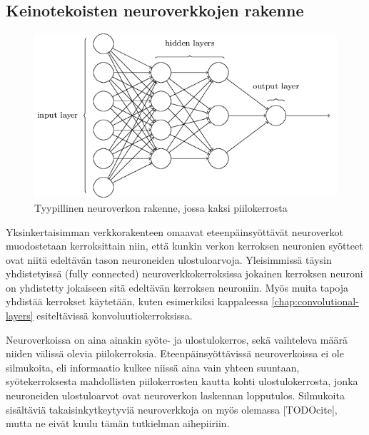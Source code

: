 \documentclass[finnish]{tktltiki2}
\theoremstyle{definition}
\theoremstyle{remark}
\begin{document}

  \subsection{Keinotekoisten neuroverkkojen rakenne}

  \begin{figure}[h]
    \centering
    \includegraphics[scale=0.5]{basic-neuralnet}
    \caption{Tyypillinen neuroverkon rakenne, jossa kaksi piilokerrosta \cite{Nielsen-neural}}
    \label{pic:neuralnet}
  \end{figure}

  Yksinkertaisimman verkkorakenteen omaavat eteenpäinsyöttävät neuroverkot muodostetaan kerroksittain niin, että kunkin verkon kerroksen neuronien syötteet ovat niitä edeltävän tason neuroneiden ulostuloarvoja. 
  Yleisimmissä täysin yhdistetyissä (fully connected) neuroverkkokerroksissa jokainen kerroksen neuroni on yhdistetty jokaiseen sitä edeltävän kerroksen neuroniin. Myös muita tapoja yhdistää kerrokset käytetään, kuten esimerkiksi kappaleessa \ref{chap:convolutional-layers} esiteltävissä konvoluutiokerroksissa. 
  
  Neuroverkoissa on aina ainakin syöte- ja ulostulokerros, sekä vaihteleva määrä niiden välissä olevia piilokerroksia. Eteenpäinsyöttävissä neuroverkoissa ei ole silmukoita, eli informaatio kulkee niissä aina vain yhteen suuntaan, syötekerroksesta mahdollisten piilokerrosten kautta kohti ulostulokerrosta, jonka neuroneiden ulostuloarvot ovat neuroverkon laskennan lopputulos. Silmukoita sisältäviä takaisinkytkeytyviä neuroverkkoja on myös olemassa [TODOcite], mutta ne eivät kuulu tämän tutkielman aihepiiriin.
\end{document}

